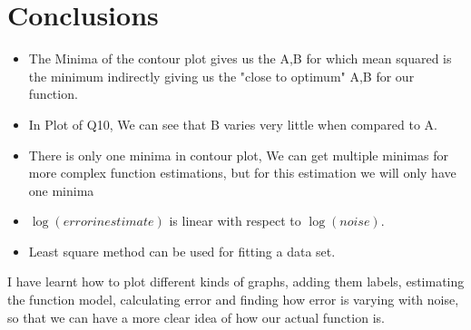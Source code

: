 \documentclass[12pt, a4paper]{report}
\begin{document}
\section{Conclusions}
\begin{itemize}
   \item The Minima of the contour plot gives us the A,B for which mean squared is the minimum indirectly giving us the "close to optimum" A,B for our function.
    \item In Plot of Q10, We can see that B varies very little when compared to A.
    \item There is only one minima in contour plot, We can get multiple minimas for more complex function estimations, but for this estimation we will only have one minima
    \item $\log(error in estimate)$ is linear with respect to $\log(noise)$.
    \item Least square method can be used for fitting a data set.
\end{itemize}
I have learnt how to plot different kinds of graphs, adding them labels, estimating the function model, calculating error and finding how error is varying with noise, so that we can have a more clear idea of how our actual function is.
\end{document}
